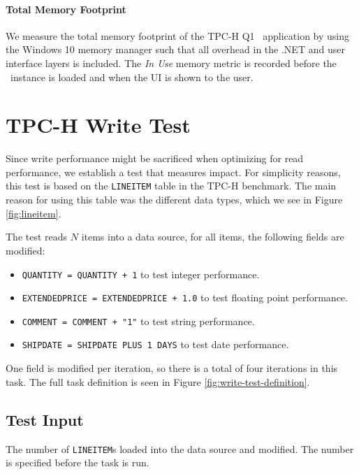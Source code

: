 \paragraph{Total Memory Footprint}
\label{par:Total Memory Footprint}
We measure the total memory footprint of the TPC-H Q1 \gd~application by using the Windows 10 memory manager such that all overhead in the .NET and user interface layers is included. The \textit{In Use} memory metric is recorded before the \gd~instance is loaded and when the UI is shown to the user. 

\section{TPC-H Write Test}
\label{test:write-test}
Since write performance might be sacrificed when optimizing for read performance, we establish a test that measures impact. For simplicity reasons, this test is based on the \texttt{LINEITEM} table in the TPC-H benchmark. The main reason for using this table was the different data types, which we see in Figure \ref{fig:lineitem}.

The test reads $N$ items into a data source, for all items, the following fields are modified:
\begin{itemize}
    \item \texttt{QUANTITY = QUANTITY + 1} to test integer performance.
    \item \texttt{EXTENDEDPRICE = EXTENDEDPRICE + 1.0} to test floating point performance.
    \item \texttt{COMMENT = COMMENT + "1"} to test string performance.
    \item \texttt{SHIPDATE = SHIPDATE PLUS 1 DAYS} to test date performance.
\end{itemize}
One field is modified per iteration, so there is a total of four iterations in this task. The full task definition is seen in Figure \ref{fig:write-test-definition}.

\subsection{Test Input}
\label{sub:Test Input}
The number of \texttt{LINEITEM}s loaded into the data source and modified. The number is specified before the task is run.

